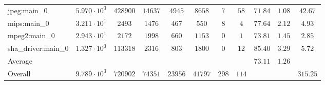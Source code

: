 \begin{tabular}{|l|c|c|c|c|c|c|c|c|c|c|}
jpeg:main\_0            & $ 5.970 \cdot 10^{3} $ & $ 428900 $ & $ 14637 $ & $ 4945  $ & $ 8658  $ & $ 7   $ & $ 58  $ & $ 71.84       $ & $ 1.08    $ & $ 42.67   $ \\
mips:main\_0            & $ 3.211 \cdot 10^{1} $ & $ 2493   $ & $ 1476  $ & $ 467   $ & $ 550   $ & $ 8   $ & $ 4   $ & $ 77.64       $ & $ 2.12    $ & $ 4.93    $ \\
mpeg2:main\_0           & $ 2.943 \cdot 10^{1} $ & $ 2172   $ & $ 1998  $ & $ 660   $ & $ 1153  $ & $ 0   $ & $ 1   $ & $ 73.81       $ & $ 1.45    $ & $ 2.85    $ \\
sha\_driver:main\_0     & $ 1.327 \cdot 10^{3} $ & $ 113318 $ & $ 2316  $ & $ 803   $ & $ 1800  $ & $ 0   $ & $ 12  $ & $ 85.40       $ & $ 3.29    $ & $ 5.72    $ \\
\hline
Average                 & $                    $ & $        $ & $       $ & $       $ & $       $ & $     $ & $     $ & $ 73.11       $ & $ 1.26    $ & $         $ \\
\hline
Overall                 & $ 9.789 \cdot 10^{3} $ & $ 720902 $ & $ 74351 $ & $ 23956 $ & $ 41797 $ & $ 298 $ & $ 114 $ & $             $ & $         $ & $ 315.25  $ \\
\hline
\end{tabular}
